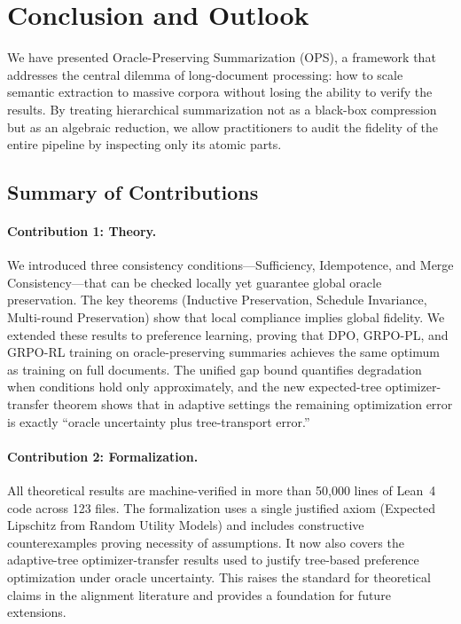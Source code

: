 \section{Conclusion and Outlook}\label{sec:conclusion}

We have presented Oracle-Preserving Summarization (OPS), a framework that addresses the central dilemma of long-document processing: how to scale semantic extraction to massive corpora without losing the ability to verify the results. By treating hierarchical summarization not as a black-box compression but as an algebraic reduction, we allow practitioners to audit the fidelity of the entire pipeline by inspecting only its atomic parts.

\subsection{Summary of Contributions}

\paragraph{Contribution 1: Theory.}
We introduced three consistency conditions---Sufficiency, Idempotence, and Merge Consistency---that can be checked locally yet guarantee global oracle preservation. The key theorems (Inductive Preservation, Schedule Invariance, Multi-round Preservation) show that local compliance implies global fidelity. We extended these results to preference learning, proving that DPO, GRPO-PL, and GRPO-RL training on oracle-preserving summaries achieves the same optimum as training on full documents. The unified gap bound quantifies degradation when conditions hold only approximately, and the new expected-tree optimizer-transfer theorem shows that in adaptive settings the remaining optimization error is exactly ``oracle uncertainty plus tree-transport error.''

\paragraph{Contribution 2: Formalization.}
All theoretical results are machine-verified in more than 50,000 lines of Lean~4 code across 123 files. The formalization uses a single justified axiom (Expected Lipschitz from Random Utility Models) and includes constructive counterexamples proving necessity of assumptions. It now also covers the adaptive-tree optimizer-transfer results used to justify tree-based preference optimization under oracle uncertainty. This raises the standard for theoretical claims in the alignment literature and provides a foundation for future extensions.

